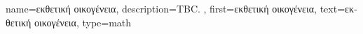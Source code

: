 {name={\foreignlanguage{greek}{εκθετική οικογένεια}},
	description={TBC. },
	first={\foreignlanguage{greek}{εκθετική οικογένεια}},
	text={\foreignlanguage{greek}{εκθετική οικογένεια}},
	type=math
}

